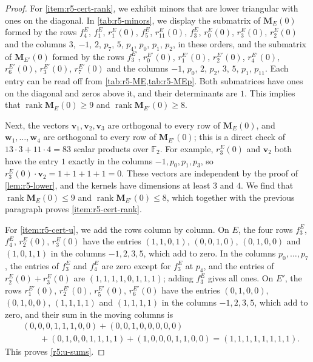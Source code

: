 \documentclass[12pt,oneside,openany]{book}
\theoremstyle{definition}
\theoremstyle{plain}
\numberwithin{equation}{chapter}
\theoremstyle{plain}
\theoremstyle{definition}
\theoremstyle{remark}
\newcommand{\F}{\mathbb F}
\DeclareMathOperator{\rk}{rank}
\begin{document}
\begin{proof}
For \ref{item:r5-cert-rank}, we exhibit minors that are lower triangular with ones on the diagonal. In \cref{tab:r5-minors}, we display the submatrix of $\mathbf M_E(0)$ formed by the rows $f^E_4$, $f^E_1$, $r^E_1(0)$, $f^E_5$, $r^E_{11}(0)$, $f^E_3$, $r^E_0(0)$, $r^E_3(0)$, $r^E_2(0)$ and the columns $3$, $-1$, $2$, $p_7$, $5$, $p_4$, $p_0$, $p_1$, $p_2$, in these orders, and the submatrix of $\mathbf M_{E'}(0)$ formed by the rows $f^{E'}_3$, $r^{E'}_0(0)$, $r^{E'}_1(0)$, $r^{E'}_2(0)$, $r^{E'}_4(0)$, $r^{E'}_6(0)$, $r^{E'}_3(0)$, $r^{E'}_7(0)$ and the columns $-1$, $p_0$, $2$, $p_2$, $3$, $5$, $p_1$, $p_{11}$. Each entry can be read off from \cref{tab:r5-ME,tab:r5-MEp}. Both submatrices have ones on the diagonal and zeros above it, and their determinants are $1$. This implies that $\rk\mathbf M_E(0)\ge9$ and $\rk\mathbf M_{E'}(0)\ge8$.

Next, the vectors $\mathbf v_1,\mathbf v_2,\mathbf v_3$ are orthogonal to every row of $\mathbf M_E(0)$, and $\mathbf w_1,\dots,\mathbf w_4$ are orthogonal to every row of $\mathbf M_{E'}(0)$; this is a direct check of $13\cdot3+11\cdot4=83$ scalar products over $\F_2$. For example, $r^E_3(0)$ and $\mathbf v_2$ both have the entry $1$ exactly in the columns $-1,p_0,p_1,p_3$, so $r^E_3(0)\cdot \mathbf v_2=1+1+1+1=0$. These vectors are independent by the proof of \cref{lem:r5-lower}, and the kernels have dimensions at least $3$ and $4$. We find that $\rk\mathbf M_E(0)\le9$ and $\rk\mathbf M_{E'}(0)\le8$, which together with the previous paragraph proves \ref{item:r5-cert-rank}.

For \ref{item:r5-cert-u}, we add the rows column by column. On $E$, the four rows $f^E_3$, $f^E_4$, $r^E_2(0)$, $r^E_3(0)$ have the entries $(1,1,0,1)$, $(0,0,1,0)$, $(0,1,0,0)$ and $(1,0,1,1)$ in the columns $-1,2,3,5$, which add to zero. In the columns $p_0,\dots,p_7$, the entries of $f^E_3$ and $f^E_4$ are zero except for $f^E_3$ at $p_4$, and the entries of $r^E_2(0)+r^E_3(0)$ are $(1,1,1,1,0,1,1,1)$; adding $f^E_3$ gives all ones. On $E'$, the rows $r^{E'}_1(0)$, $r^{E'}_2(0)$, $r^{E'}_5(0)$, $r^{E'}_6(0)$ have the entries $(0,1,0,0)$, $(0,1,0,0)$, $(1,1,1,1)$ and $(1,1,1,1)$ in the columns $-1,2,3,5$, which add to zero, and their sum in the moving columns is
\[
\begin{aligned}
&(0,0,0,1,1,1,0,0)+(0,0,1,0,0,0,0,0)\\
&\qquad+(0,1,0,0,1,1,1,1)+(1,0,0,0,1,1,0,0)=(1,1,1,1,1,1,1,1).
\end{aligned}
\]
This proves \eqref{r5:u-sums}.
\end{proof}
\end{document}
